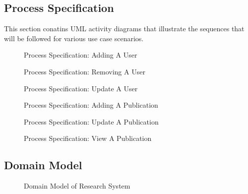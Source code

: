 \documentclass[a4paper]{article}
\begin{document}
    \subsection{Process Specification}
	This section conatins UML activity diagrams that illustrate the sequences that will be followed for various use case scenarios.
	\begin{figure}[H]
	    \centering
	    \caption{Process Specification: Adding A User}
	\end{figure}
	\begin{figure}[H]
	    \centering
	    \caption{Process Specification: Removing A User}
	\end{figure}
	\begin{figure}[H]
	    \centering
	    \caption{Process Specification: Update A User}
	\end{figure}
		\begin{figure}[H]
	    \centering
	    \caption{Process Specification: Adding A Publication}
	\end{figure}
		\begin{figure}[H]
	    \centering
	    \caption{Process Specification: Update A Publication}
	\end{figure}
		\begin{figure}[H]
	    \centering
	    \caption{Process Specification: View A Publication}
	\end{figure}
	\subsection{Domain Model}
	\begin{figure}[H]
		\caption{Domain Model of Research System \label{overflow}}
	\end{figure}
	\pagebreak
\end{document}
